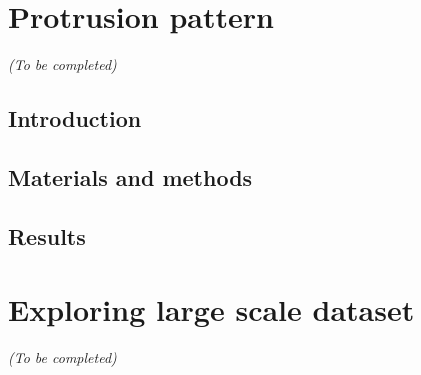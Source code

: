 \section{Protrusion pattern}
\label{sec:protrusion}

\begin{center}
	\textit{(To be completed)}
\end{center}

\subsection{Introduction}
\label{subsec:introduction_protrusion}

\subsection{Materials and methods}
\label{subsec:materials_protrusion}

\subsection{Results}
\label{subsec:results_protrusion}

\section{Exploring large scale dataset}
\label{sec:exploration}

\begin{center}
	\textit{(To be completed)}
\end{center}



